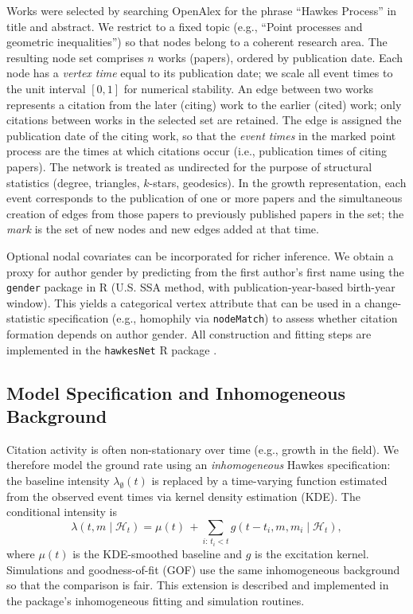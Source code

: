\documentclass[12pt]{article}
\begin{document}
Works were selected by searching OpenAlex for the phrase ``Hawkes Process'' in title and abstract. We restrict to a fixed topic (e.g., ``Point processes and geometric inequalities'') so that nodes belong to a coherent research area. The resulting node set comprises $n$ works (papers), ordered by publication date. Each node has a \emph{vertex time} equal to its publication date; we scale all event times to the unit interval $[0,1]$ for numerical stability. An edge between two works represents a citation from the later (citing) work to the earlier (cited) work; only citations between works in the selected set are retained. The edge is assigned the publication date of the citing work, so that the \emph{event times} in the marked point process are the times at which citations occur (i.e., publication times of citing papers). The network is treated as undirected for the purpose of structural statistics (degree, triangles, $k$-stars, geodesics). In the growth representation, each event corresponds to the publication of one or more papers and the simultaneous creation of edges from those papers to previously published papers in the set; the \emph{mark} is the set of new nodes and new edges added at that time.

Optional nodal covariates can be incorporated for richer inference. We obtain a proxy for author gender by predicting from the first author's first name using the \texttt{gender} package in R (U.S. SSA method, with publication-year-based birth-year window). This yields a categorical vertex attribute that can be used in a change-statistic specification (e.g., homophily via \texttt{nodeMatch}) to assess whether citation formation depends on author gender. All construction and fitting steps are implemented in the \texttt{hawkesNet} R package \citep{hawkesNest}.

\subsection{Model Specification and Inhomogeneous Background}

Citation activity is often non-stationary over time (e.g., growth in the field). We therefore model the ground rate using an \emph{inhomogeneous} Hawkes specification: the baseline intensity $\lambda_{\emptyset}(t)$ is replaced by a time-varying function estimated from the observed event times via kernel density estimation (KDE). The conditional intensity is
\[
\lambda(t,m\mid\mathcal{H}_t) = \mu(t)\, + \sum_{i:\,t_i<t} g(t-t_i,m,m_i\mid\mathcal{H}_t),
\]
where $\mu(t)$ is the KDE-smoothed baseline and $g$ is the excitation kernel. Simulations and goodness-of-fit (GOF) use the same inhomogeneous background so that the comparison is fair. This extension is described and implemented in the package's inhomogeneous fitting and simulation routines.
\end{document}
